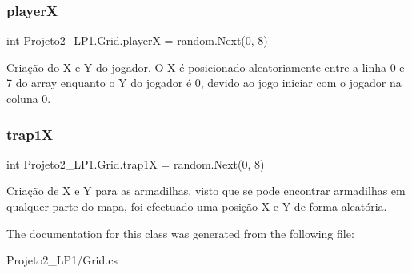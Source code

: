 \subsubsection{\texorpdfstring{playerX}{playerX}}
{\footnotesize\ttfamily int Projeto2\+\_\+\+L\+P1.\+Grid.\+playerX = random.\+Next(0, 8)}



Criação do X e Y do jogador. O X é posicionado aleatoriamente entre a linha 0 e 7 do array enquanto o Y do jogador é 0, devido ao jogo iniciar com o jogador na coluna 0. 

\mbox{\label{class_projeto2___l_p1_1_1_grid_a0734840445dd0b3453df5339e4f9bc4a}} 
\subsubsection{\texorpdfstring{trap1X}{trap1X}}
{\footnotesize\ttfamily int Projeto2\+\_\+\+L\+P1.\+Grid.\+trap1X = random.\+Next(0, 8)}



Criação de X e Y para as armadilhas, visto que se pode encontrar armadilhas em qualquer parte do mapa, foi efectuado uma posição X e Y de forma aleatória. 



The documentation for this class was generated from the following file\+:\begin{DoxyCompactItemize}
\item 
Projeto2\+\_\+\+L\+P1/Grid.\+cs\end{DoxyCompactItemize}
